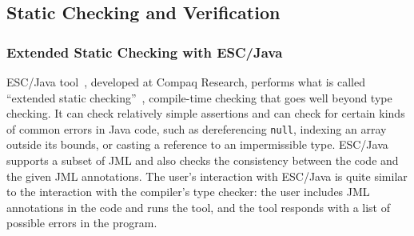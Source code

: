 %
%

\subsection{Static Checking and Verification}
\label{toolsEnd}

\subsubsection{Extended Static Checking with ESC/Java}
\label{escjava}

ESC/Java tool~\cite{Flanagan-Et-Al02}, developed at Compaq Research,
performs what is called ``extended static
checking''~\cite{ESC:Overview,10yearsESC},
compile-time checking that goes well beyond type checking.  It can
check relatively simple assertions and can check for certain kinds of
common errors in Java code, such as dereferencing \texttt{null},
indexing an array outside its bounds, or casting a reference to an
impermissible type.  ESC/Java supports a subset of JML and also checks
the consistency between the code and the given JML annotations.  The
user's interaction with ESC/Java is quite similar to the interaction
with the compiler's type checker: the user includes JML annotations in
the code and runs the tool, and the tool responds with a list of
possible errors in the program.

